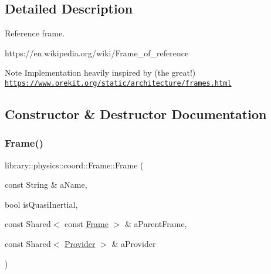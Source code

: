 \subsection{Detailed Description}
Reference frame. 

https\+://en.wikipedia.\+org/wiki/\+Frame\+\_\+of\+\_\+reference \begin{DoxyNote}{Note}
Implementation heavily inspired by (the great!) \href{https://www.orekit.org/static/architecture/frames.html}{\tt https\+://www.\+orekit.\+org/static/architecture/frames.\+html} 
\end{DoxyNote}


\subsection{Constructor \& Destructor Documentation}
\mbox{\label{classlibrary_1_1physics_1_1coord_1_1_frame_a53c1f8884a118492a3b024317c0ae0fd}} 
\subsubsection{\texorpdfstring{Frame()}{Frame()}}
{\footnotesize\ttfamily library\+::physics\+::coord\+::\+Frame\+::\+Frame (\begin{DoxyParamCaption}\item[{const String \&}]{a\+Name,  }\item[{bool}]{is\+Quasi\+Inertial,  }\item[{const Shared$<$ const \hyperlink{classlibrary_1_1physics_1_1coord_1_1_frame}{Frame} $>$ \&}]{a\+Parent\+Frame,  }\item[{const Shared$<$ \hyperlink{classlibrary_1_1physics_1_1coord_1_1frame_1_1_provider}{Provider} $>$ \&}]{a\+Provider }\end{DoxyParamCaption})}

\mbox{\label{classlibrary_1_1physics_1_1coord_1_1_frame_a7a4b031eff12e290c0ccacb7d5a47dfd}} 
